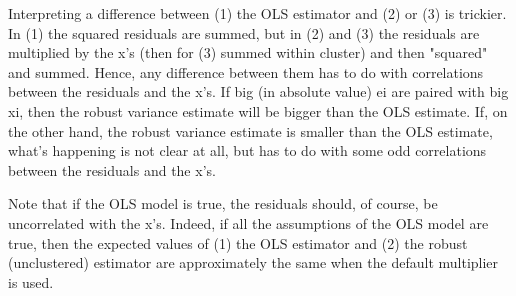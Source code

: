 Interpreting a difference between (1) the OLS estimator and (2) or (3) is
trickier. In (1) the squared residuals are summed, but in (2) and (3) the
residuals are multiplied by the x's (then for (3) summed within cluster) and
then "squared" and summed. Hence, any difference between them has to do with
correlations between the residuals and the x's. If big (in absolute value) ei
are paired with big xi, then the robust variance estimate will be bigger than
the OLS estimate. If, on the other hand, the robust variance estimate is
smaller than the OLS estimate, what's happening is not clear at all, but has to
do with some odd correlations between the residuals and the x's.

Note that if the OLS model is true, the residuals should, of course, be
uncorrelated with the x's. Indeed, if all the assumptions of the OLS model are
true, then the expected values of (1) the OLS estimator and (2) the robust
(unclustered) estimator are approximately the same when the default multiplier
is used.
